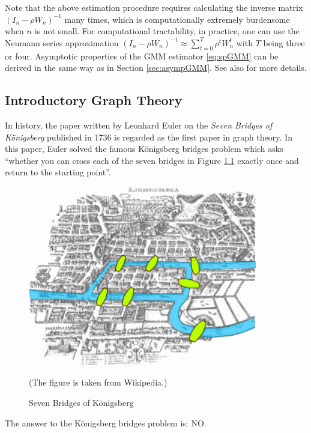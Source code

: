 \documentclass[10.5pt, A4paper, openany, uplatex]{book}
\numberwithin{equation}{section}
\begin{document}
Note that the above estimation procedure requires calculating the inverse matrix $(I_n - \rho W_n)^{-1}$ many times, which is computationally extremely burdensome when $n$ is not small.
For computational tractability, in practice, one can use the Neumann series approximation $(I_n - \rho W_n)^{-1} \approx \sum_{t = 0}^T \rho^t W_n^t$ with $T$ being three or four.
Asymptotic properties of the GMM estimator \eqref{eq:spGMM} can be derived in the same way as in Section \ref{sec:asympGMM}.
See also \cite{pinkse1998contracting} for more details.

\begin{appendices}

	\chapter{Introductory Graph Theory}
	
	In history, the paper written by Leonhard Euler on the \textit{Seven Bridges of K\"onigsberg} published in 1736 is regarded as the first paper in graph theory. 
	In this paper, Euler solved the famous K\"onigsberg bridges problem which asks ``whether you can cross each of the seven bridges in Figure \ref{fig:konig} exactly once and return to the starting point''.
	
	\begin{figure}[h!]
		\begin{center}
			\includegraphics[width = 10cm]{konigsberg.png}
			\caption{Seven Bridges of K\"onigsberg\label{fig:konig}}
			\footnotesize{(The figure is taken from Wikipedia.)}\normalsize
		\end{center}
	\end{figure}
	
	The answer to the K\"onigsberg bridges problem is: NO.
	 

\end{appendices}
\end{document}
